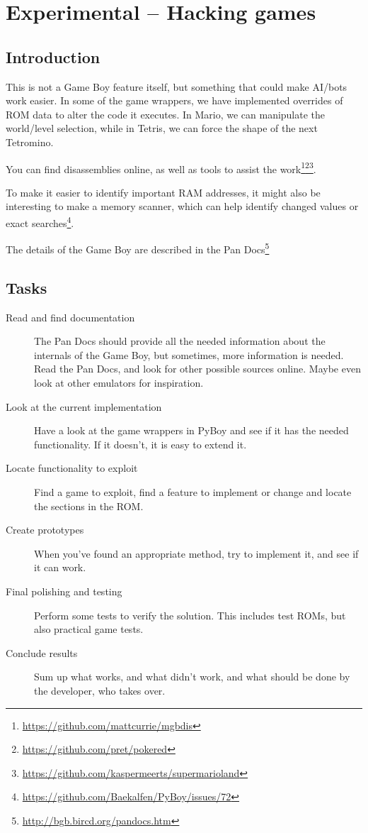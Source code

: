 \documentclass[11pt]{report} %
\author{Mads Ynddal}
\begin{document}
\onecolumn


\chapter*{Experimental -- Hacking games}
\section*{Introduction}
This is not a Game Boy feature itself, but something that could make AI/bots work easier. In some of the game wrappers, we have implemented overrides of ROM data to alter the code it executes. In Mario, we can manipulate the world/level selection, while in Tetris, we can force the shape of the next Tetromino.

You can find disassemblies online, as well as tools to assist the work\footnote{\url{https://github.com/mattcurrie/mgbdis}}\footnote{\url{https://github.com/pret/pokered}}\footnote{\url{https://github.com/kaspermeerts/supermarioland}}.

To make it easier to identify important RAM addresses, it might also be interesting to make a memory scanner, which can help identify changed values or exact searches\footnote{\url{https://github.com/Baekalfen/PyBoy/issues/72}}.

The details of the Game Boy are described in the Pan Docs\footnote{\url{http://bgb.bircd.org/pandocs.htm}}

\section*{Tasks}
\begin{description}
    \item [Read and find documentation]
        The Pan Docs should provide all the needed information about the internals of the Game Boy, but sometimes, more information is needed. Read the Pan Docs, and look for other possible sources online. Maybe even look at other emulators for inspiration.

    \item [Look at the current implementation]
        Have a look at the game wrappers in PyBoy and see if it has the needed functionality. If it doesn't, it is easy to extend it.

    \item [Locate functionality to exploit]
        Find a game to exploit, find a feature to implement or change and locate the sections in the ROM.

    \item [Create prototypes]
        When you've found an appropriate method, try to implement it, and see if it can work.

    \item [Final polishing and testing]
        Perform some tests to verify the solution. This includes test ROMs, but also practical game tests.

    \item [Conclude results]
        Sum up what works, and what didn't work, and what should be done by the developer, who takes over.
\end{description}
\end{document}
